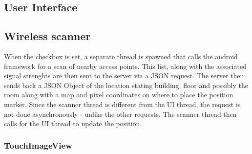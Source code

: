 \subsection{User Interface}

\subsection{Wireless scanner}
When the checkbox is set, a separate thread is spawned that calls the android framework for a scan of nearby access points. This list, along with the associated signal strenghts are then sent to the server via a JSON request. The server then sends back a JSON Object of the location stating building, floor and possibly the room along with a map and pixel coordinates on where to place the position marker. Since the scanner thread is different from the UI thread, the request is not done asynchronously - unlike the other requests. The scanner thread then calls for the UI thread to update the position.

\subsubsection{TouchImageView}


